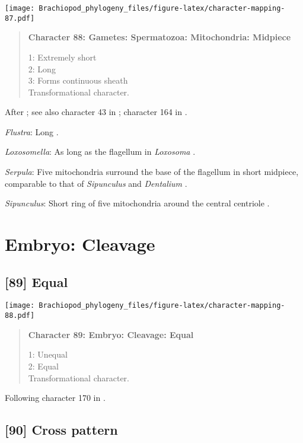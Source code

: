 \documentclass[openany]{book}
\theoremstyle{definition}
\theoremstyle{definition}
\theoremstyle{definition}
\theoremstyle{remark}
\begin{document}
\texttt{[image: Brachiopod\_phylogeny\_files/figure-latex/character-mapping-87.pdf]}

\begin{quote}
\textbf{Character 88: Gametes: Spermatozoa: Mitochondria: Midpiece}

1: Extremely short\\
2: Long\\
3: Forms continuous sheath\\
Transformational character.
\end{quote}

After \citet{Smith2012}; see also character 43 in \citet{Ponder1997};
character 164 in \citet{Giribet2002}.

\hypertarget{Flustra-coding-88}{}
\emph{Flustra}: Long \citep{Franzen1981}.

\hypertarget{Loxosomella-coding-88}{}
\emph{Loxosomella}: As long as the flagellum in \emph{Loxosoma}
\citep{Franzen2000}.

\hypertarget{Serpula-coding-88}{}
\emph{Serpula}: Five mitochondria surround the base of the flagellum in
short midpiece, comparable to that of \emph{Sipunculus} and
\emph{Dentalium} \citep{Gherardi2011}.

\hypertarget{Sipunculus-coding-88}{}
\emph{Sipunculus}: Short ring of five mitochondria around the central
centriole \citep{Rice1993}.

\section{Embryo: Cleavage}\label{embryo-cleavage}

\subsection*{{[}89{]} Equal}\label{equal}

\texttt{[image: Brachiopod\_phylogeny\_files/figure-latex/character-mapping-88.pdf]}

\begin{quote}
\textbf{Character 89: Embryo: Cleavage: Equal}

1: Unequal\\
2: Equal\\
Transformational character.
\end{quote}

Following character 170 in \citet{Giribet2002}.

\subsection*{{[}90{]} Cross pattern}\label{cross-pattern}
\end{document}
